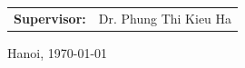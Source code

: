 \begin{titlepage}
\begin{center}
\vspace{1.8cm}

\begin{tabular}{ll}
\textbf{\fontsize{14pt}{17pt}\selectfont Supervisor:} 
& {\fontsize{14pt}{17pt}\selectfont Dr. Phung Thi Kieu Ha}
\end{tabular}

\vfill

{\fontsize{13pt}{16pt}\selectfont Hanoi, \today}

\vspace{0.3cm}

\end{center}

\end{titlepage}

\cleardoublepage
